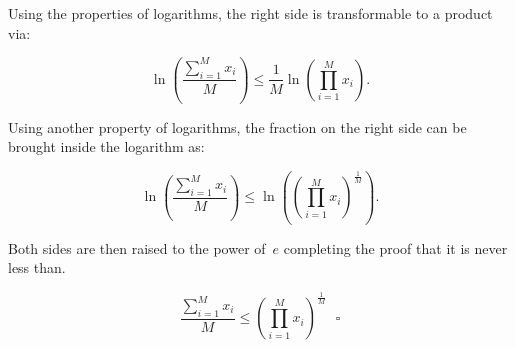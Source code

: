 \documentclass{report}
\begin{document}
  Using the properties of logarithms, the right side is transformable to a product via:
  
  \[ \ln \left( \frac{\sum_{i=1}^{M}{x_i}}{M} \right) \leq \frac{1}{M}{\ln \left( \prod_{i=1}^M{x_i} \right)}\textrm{.} \]
  
  Using another property of logarithms, the fraction on the right side can be brought inside the logarithm as:
  
  \[ \ln \left( \frac{\sum_{i=1}^{M}{x_i}}{M} \right) \leq \ln \left( \left( \prod_{i=1}^M{x_i}\right)^\frac{1}{M} \right) \textrm{.} \]
  
  Both sides are then raised to the power of~$e$ completing the proof that it is never less than.
  
    \[ \frac{\sum_{i=1}^{M}{x_i}}{M} \leq \left( \prod_{i=1}^M{x_i}\right)^\frac{1}{M}  ~~~\square \]
\end{document}
